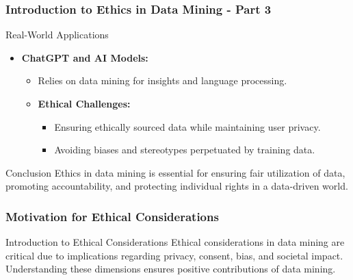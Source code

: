 \documentclass[aspectratio=169]{beamer}
\begin{document}
\begin{frame}[fragile]
    \frametitle{Introduction to Ethics in Data Mining - Part 3}
    
    \begin{block}{Real-World Applications}
        \begin{itemize}
            \item \textbf{ChatGPT and AI Models:}
            \begin{itemize}
                \item Relies on data mining for insights and language processing.
                \item \textbf{Ethical Challenges:}
                \begin{itemize}
                    \item Ensuring ethically sourced data while maintaining user privacy.
                    \item Avoiding biases and stereotypes perpetuated by training data.
                \end{itemize}
            \end{itemize}
        \end{itemize}
    \end{block}
    
    \begin{block}{Conclusion}
        Ethics in data mining is essential for ensuring fair utilization of data, promoting accountability, and protecting individual rights in a data-driven world.
    \end{block}
\end{frame}

\begin{frame}[fragile]
    \frametitle{Motivation for Ethical Considerations}
    \begin{block}{Introduction to Ethical Considerations}
        Ethical considerations in data mining are critical due to implications regarding privacy, consent, bias, and societal impact. Understanding these dimensions ensures positive contributions of data mining.
    \end{block}
\end{frame}
\end{document}
